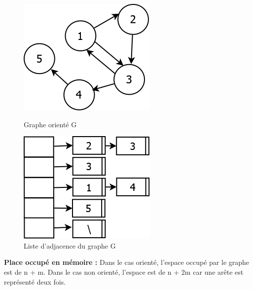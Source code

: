\begin{figure}[H]
	\begin{minipage}[c]{.46\linewidth}
	\begin{center}
		\includegraphics[height=100 pt, width=110 pt]{./ressources/image/graphAdjace.png} 
		\caption{Graphe orienté G}
		\label{grapAdjac2}
	\end{center}
	\end{minipage} 
	\begin{minipage}[c]{.46\linewidth}
	\begin{center}
		\includegraphics[height=110 pt, width=140 pt]{./ressources/image/listeAdjace.png} 
		\caption{Liste d'adjacence du graphe G}
		\label{listeAdjac}
	\end{center}
	\end{minipage} 
\end{figure}


\textbf{Place occupé en mémoire :} Dans le cas orienté, l'espace occupé par le graphe est de n + m. Dans le cas non orienté, l'espace est de n + 2m car une arête est représenté deux fois.